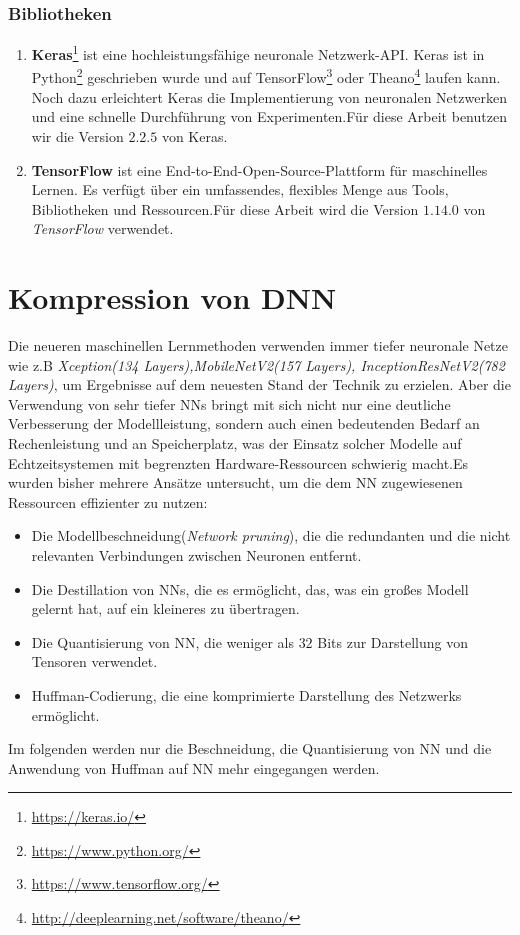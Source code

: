 \documentclass[12pt,a4paper]{scrartcl}
\numberwithin{equation}{section}
\begin{document}
\subsubsection{Bibliotheken}
\begin{enumerate}
	\item \textbf{Keras}\footnote{\href{https://keras.io/}{https://keras.io/}}
		 ist eine hochleistungsfähige neuronale Netzwerk-API. Keras ist in Python\footnote{\href{https://www.python.org/}{https://www.python.org/}} geschrieben wurde und auf TensorFlow\footnote{\href{https://www.tensorflow.org/}{https://www.tensorflow.org/}} oder Theano\footnote{\href{http://deeplearning.net/software/theano/}{http://deeplearning.net/software/theano/}} laufen kann. Noch dazu erleichtert Keras die Implementierung von neuronalen Netzwerken und eine schnelle Durchführung von Experimenten.Für diese Arbeit benutzen wir die  Version  $ 2.2.5 $ von Keras.
	\item \textbf{TensorFlow}  ist eine End-to-End-Open-Source-Plattform für maschinelles Lernen. Es verfügt über ein umfassendes, flexibles Menge aus Tools, Bibliotheken und Ressourcen.Für diese Arbeit wird die  Version  $ 1.14.0 $ von \textit{TensorFlow} verwendet.
	
\end{enumerate}

\section{Kompression von \ac{DNN}}\label{kompression}
Die neueren maschinellen Lernmethoden verwenden immer tiefer neuronale Netze wie z.B \textit{Xception(134 Layers),MobileNetV2(157 Layers), InceptionResNetV2(782 Layers)}, um Ergebnisse auf dem neuesten Stand der Technik zu erzielen. Aber die Verwendung von sehr tiefer \acsp{NN} bringt mit sich nicht nur eine deutliche Verbesserung der Modellleistung, sondern auch einen bedeutenden Bedarf an Rechenleistung und an Speicherplatz, was der Einsatz solcher Modelle auf Echtzeitsystemen mit begrenzten Hardware-Ressourcen schwierig macht.Es wurden bisher mehrere Ansätze untersucht, um die dem \ac{NN} zugewiesenen Ressourcen effizienter zu nutzen:
\begin{itemize}
	\item Die Modellbeschneidung(\textit{Network pruning}), die die redundanten und  die nicht relevanten Verbindungen zwischen Neuronen entfernt.
	 \item Die Destillation von \acsp{NN}, die es ermöglicht, das, was ein großes Modell gelernt hat, auf ein kleineres zu übertragen. 	
 \item Die Quantisierung von \ac{NN}, die weniger als $32 $ Bits zur Darstellung von Tensoren verwendet.
 \item  Huffman-Codierung, die eine komprimierte Darstellung des Netzwerks ermöglicht.
\end{itemize} 
Im folgenden werden nur die Beschneidung, die Quantisierung von \ac{NN} und die Anwendung von Huffman auf \ac{NN} mehr eingegangen werden.
\end{document}
